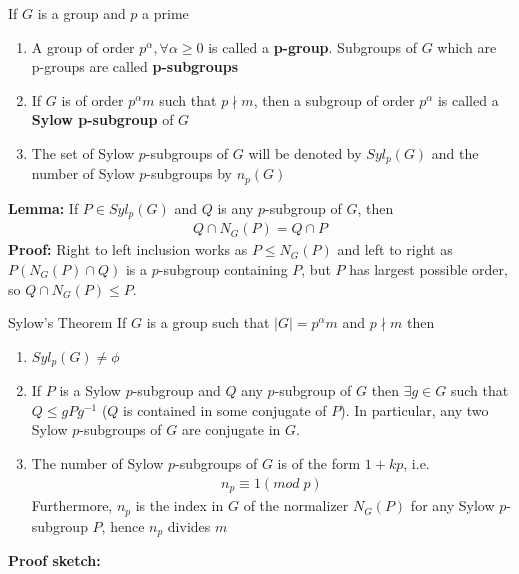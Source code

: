 \documentclass[titlepage, 12pt]{book}
\begin{document}
\begin{definition}{}{}
    If $G$ is a group and $p$ a prime
    \begin{enumerate}
        \item A group of order $p^\alpha,\forall\alpha\geq 0$ is called a
            \textbf{p-group}. Subgroups of $G$ which are p-groups are called
            \textbf{p-subgroups}
        \item If $G$ is of order $p^\alpha m$ such that $p\nmid m$, then a
            subgroup of order $p^\alpha$ is called a \textbf{Sylow p-subgroup}
            of $G$
        \item The set of Sylow $p$-subgroups of $G$ will be denoted by
            $Syl_p(G)$ and the number of Sylow $p$-subgroups by $n_p(G)$
    \end{enumerate}
\end{definition}

\textbf{Lemma:} If $P\in Syl_p(G)$ and $Q$ is any $p$-subgroup of $G$, then
\begin{gather*}
Q\cap N_G(P) = Q\cap P
\end{gather*}
\textbf{Proof:} Right to left inclusion works as $P\leq N_G(P)$ and left to
right as $P(N_G(P)\cap Q)$ is a $p$-subgroup containing $P$, but $P$ has largest
possible order, so $Q\cap N_G(P)\leq P$.

\begin{theorem}{Sylow's Theorem}{}
    If $G$ is a group such that $|G| = p^\alpha m$ and $p\nmid m$ then
    \begin{enumerate}
        \item $Syl_p(G)\neq\phi$
        \item If $P$ is a Sylow $p$-subgroup and $Q$ any $p$-subgroup of $G$
            then $\exists g\in G$ such that $Q\leq gPg^{-1}$ ($Q$ is contained
            in some conjugate of $P$). In particular, any two Sylow
            $p$-subgroups of $G$ are conjugate in $G$.
        \item The number of Sylow $p$-subgroups of $G$ is of the form $1+kp$,
            i.e.
            \begin{gather*}
                n_p\equiv 1(mod\; p)
            \end{gather*}
            Furthermore, $n_p$ is the index in $G$ of the normalizer $N_G(P)$
            for any Sylow $p$-subgroup $P$, hence $n_p$ divides $m$
    \end{enumerate}
\end{theorem}
\textbf{Proof sketch:}
\end{document}
